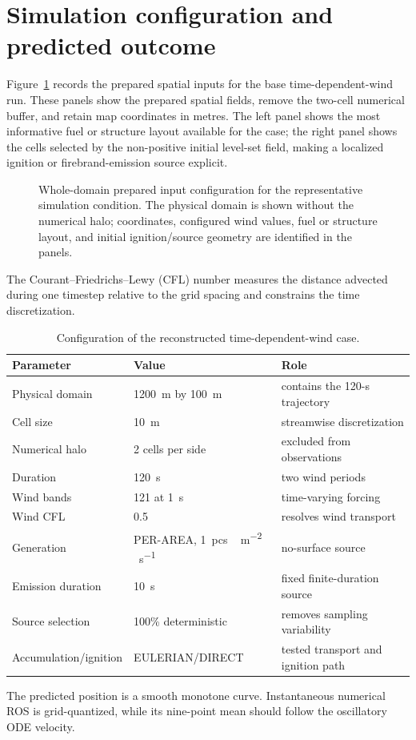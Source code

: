\section{Simulation configuration and predicted outcome}

Figure~\ref{fig:input-configuration} records the prepared spatial inputs for the base time-dependent-wind run.
These panels show the prepared spatial fields, remove the
two-cell numerical buffer, and retain map coordinates in metres.  The left panel shows
the most informative fuel or structure layout available for the case; the right panel
shows the cells selected by the non-positive initial level-set field, making a localized
ignition or firebrand-emission source explicit.

\begin{figure}[H]
\centering
{}
\caption{Whole-domain prepared input configuration for the representative simulation condition.  The
physical domain is shown without the numerical halo; coordinates, configured wind values,
fuel or structure layout, and initial ignition/source geometry are identified in the panels.}
\label{fig:input-configuration}
\end{figure}

The Courant--Friedrichs--Lewy (CFL) number measures the distance
advected during one timestep relative to the grid spacing and
constrains the time discretization.

\begin{table}[htbp]
\centering
\caption{Configuration of the reconstructed time-dependent-wind case.}
\begin{tabular}{lll}
\toprule
Parameter & Value & Role\\
\midrule
Physical domain & \SI{1200}{m} by \SI{100}{m} & contains the 120-s trajectory\\
Cell size & \SI{10}{m} & streamwise discretization\\
Numerical halo & 2 cells per side & excluded from observations\\
Duration & \SI{120}{s} & two wind periods\\
Wind bands & 121 at \SI{1}{s} & time-varying forcing\\
Wind CFL & 0.5 & resolves wind transport\\
Generation & PER-AREA, \SI{1}{pcs\,m^{-2}\,s^{-1}} & no-surface source\\
Emission duration & \SI{10}{s} & fixed finite-duration source\\
Source selection & 100\% deterministic & removes sampling variability\\
Accumulation/ignition & EULERIAN/DIRECT & tested transport and ignition path\\
\bottomrule
\end{tabular}
\end{table}
The predicted position is a smooth monotone curve. Instantaneous numerical ROS
is grid-quantized, while its nine-point mean should follow the oscillatory ODE
velocity.

